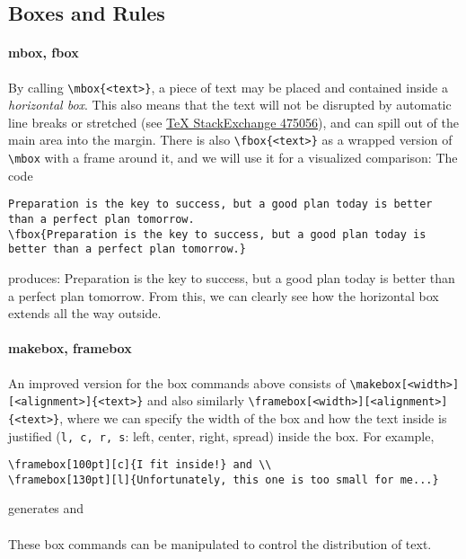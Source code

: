 \subsection{Boxes and Rules}

\paragraph{mbox, fbox}
By calling \texttt{\textbackslash mbox\{<text>\}}, a piece of text may be placed and contained inside a \textit{horizontal box}. This also means that the text will not be disrupted by automatic line breaks or stretched (see \href{https://tex.stackexchange.com/questions/475056/hbox-mbox-difference-what-they-do}{{\TeX{} StackExchange 475056}}), and can spill out of the main area into the margin. There is also \texttt{\textbackslash fbox\{<text>\}} as a wrapped version of \texttt{\textbackslash mbox} with a frame around it, and we will use it for a visualized comparison: The code
\begin{lstlisting}
Preparation is the key to success, but a good plan today is better than a perfect plan tomorrow.
\fbox{Preparation is the key to success, but a good plan today is better than a perfect plan tomorrow.}
\end{lstlisting}
produces: Preparation is the key to success, but a good plan today is better than a perfect plan tomorrow.
From this, we can clearly see how the horizontal box extends all the way outside.

\paragraph{makebox, framebox}
An improved version for the box commands above consists of \texttt{\textbackslash makebox[<width>][<alignment>]\{<text>\}} and also similarly \texttt{\textbackslash framebox[<width>][<alignment>]\{<text>\}}, where we can specify the width of the box and how the text inside is justified (\verb|l, c, r, s|: left, center, right, spread) inside the box. For example,
\begin{lstlisting}
\framebox[100pt][c]{I fit inside!} and \\
\framebox[130pt][l]{Unfortunately, this one is too small for me...}
\end{lstlisting}
generates  and \\
 \\
These box commands can be manipulated to control the distribution of text.

